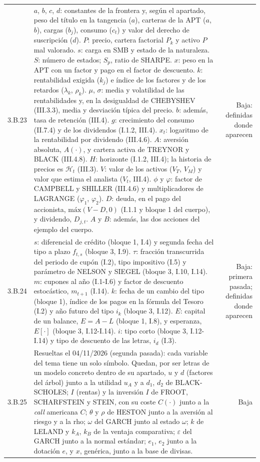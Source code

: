 \documentclass[10pt,a4paper]{article}
\begin{document}
\begin{longtable}{SMD}
3.B.23 & $a$, $b$, $c$, $d$: constantes de la frontera y, según el apartado, peso del título en la tangencia ($a$), carteras de la APT ($a$, $b$), cargas ($b_j$), consumo ($c_t$) y valor del derecho de suscripción ($d$). $P$: precio, cartera factorial $P_k$ y activo $P$ mal valorado. $s$: carga en SMB y estado de la naturaleza. $S$: número de estados; $S_p$, ratio de SHARPE. $x$: peso en la APT con un factor y pago en el factor de descuento. $k$: rentabilidad exigida ($k_j$) e índice de los factores y de los retardos ($\lambda_k$, $\rho_k$). $\mu$, $\sigma$: media y volatilidad de las rentabilidades y, en la desigualdad de CHEBYSHEV (III.3.3), media y desviación típica del precio. $b$: además, tasa de retención (III.4). $g$: crecimiento del consumo (II.7.4) y de los dividendos (I.1.2, III.4). $x_t$: logaritmo de la rentabilidad por dividendo (III.4.6). $A$: aversión absoluta, $A(\cdot)$, y cartera activa de TREYNOR y BLACK (III.4.8). $H$: horizonte (I.1.2, III.4); la historia de precios es $\mathcal H_t$ (III.3). $V$: valor de los activos ($V_T$, $V_M$) y valor que estima el analista ($V_t$, III.4). $\phi$ y $\varphi$: factor de CAMPBELL y SHILLER (III.4.6) y multiplicadores de LAGRANGE ($\varphi_1$, $\varphi_2$). $D$: deuda, en el pago del accionista, $\text{máx}(V-D,0)$ (I.1.1 y bloque 1 del cuerpo), y dividendo, $D_{j,t}$. $A$ y $B$: además, las dos acciones del ejemplo del cuerpo. & Baja: definidas donde aparecen\\
3.B.24 & $s$: diferencial de crédito (bloque 1, I.4) y segunda fecha del tipo a plazo $f_{t,s}$ (bloque 3, I.9). $\tau$: fracción transcurrida del periodo de cupón (I.2), tipo impositivo (I.5) y parámetro de NELSON y SIEGEL (bloque 3, I.10, I.14). $m$: cupones al año (I.1-I.6) y factor de descuento estocástico, $m_{t+1}$ (I.14). $k$: fecha de un cambio del tipo (bloque 1), índice de los pagos en la fórmula del Tesoro (I.2) y año futuro del tipo $i_k$ (bloque 3, I.12). $E$: capital de un balance, $E=A-L$ (bloque 1, I.8), y esperanza, $E[\cdot]$ (bloque 3, I.12-I.14). $i$: tipo corto (bloque 3, I.12-I.14) y tipo de descuento de las letras, $i_d$ (I.3). & Baja: primera pasada; definidas donde aparecen\\
3.B.25 & Resueltas el 04/11/2026 (segunda pasada): cada variable del tema tiene un solo símbolo. Quedan, por ser letras de un modelo concreto dentro de su apartado, $u$ y $d$ (factores del árbol) junto a la utilidad $u_A$ y a $d_1$, $d_2$ de BLACK-SCHOLES; $I$ (rentas) y la inversión $I$ de FROOT, SCHARFSTEIN y STEIN, con su coste $C(\cdot)$ junto a la \textit{call} americana $C$; $\theta$ y $\rho$ de HESTON junto a la aversión al riesgo y a la rho; $\omega$ del GARCH junto al estado $\omega$; $k$ de LELAND y $k_A$, $k_B$ de la ventaja comparativa; $\varepsilon$ del GARCH junto a la normal estándar; $e_1$, $e_2$ junto a la dotación $e$, y $x$, genérica, junto a la base de divisas. & Baja\\
\end{longtable}
\end{document}
